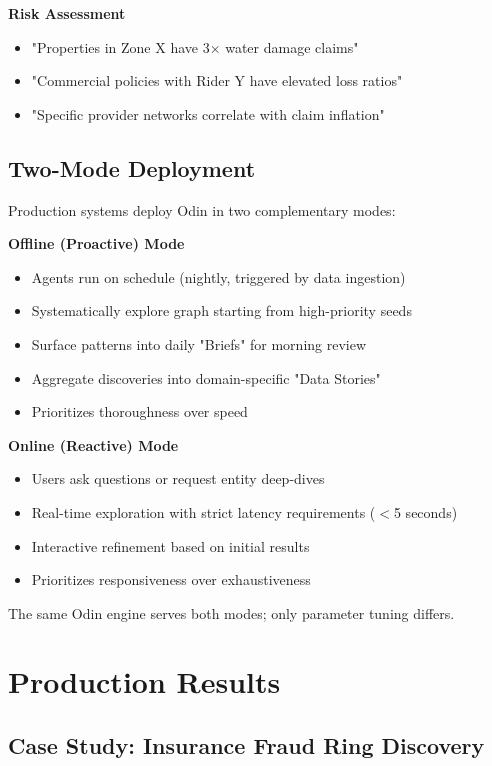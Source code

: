 \documentclass[11pt]{article}
\begin{document}
\textbf{Risk Assessment}
\begin{itemize}
\item "Properties in Zone X have 3× water damage claims"
\item "Commercial policies with Rider Y have elevated loss ratios"
\item "Specific provider networks correlate with claim inflation"
\end{itemize}

\subsection{Two-Mode Deployment}

Production systems deploy Odin in two complementary modes:

\textbf{Offline (Proactive) Mode}
\begin{itemize}
\item Agents run on schedule (nightly, triggered by data ingestion)
\item Systematically explore graph starting from high-priority seeds
\item Surface patterns into daily "Briefs" for morning review
\item Aggregate discoveries into domain-specific "Data Stories"
\item Prioritizes thoroughness over speed
\end{itemize}

\textbf{Online (Reactive) Mode}
\begin{itemize}
\item Users ask questions or request entity deep-dives
\item Real-time exploration with strict latency requirements ($<$5 seconds)
\item Interactive refinement based on initial results
\item Prioritizes responsiveness over exhaustiveness
\end{itemize}

The same Odin engine serves both modes; only parameter tuning differs.

\section{Production Results}

\subsection{Case Study: Insurance Fraud Ring Discovery}
\end{document}
